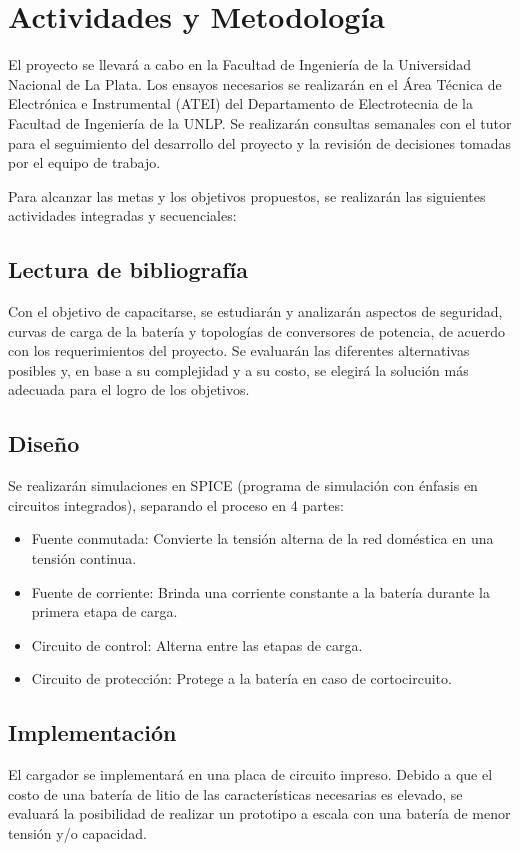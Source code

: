 \section{Actividades y Metodología}


El proyecto se llevará a cabo en la Facultad de Ingeniería de la Universidad Nacional de La Plata.
Los ensayos necesarios se realizarán en el Área Técnica de Electrónica e Instrumental (ATEI)
del Departamento de Electrotecnia de la Facultad de Ingeniería de la UNLP.
Se realizarán consultas semanales con el tutor para el seguimiento del desarrollo del proyecto y
la revisión de decisiones tomadas por el equipo de trabajo.

Para alcanzar las metas y los objetivos propuestos, se realizarán las siguientes actividades integradas y secuenciales:

\subsection{Lectura de bibliografía}
Con el objetivo de capacitarse, se estudiarán y analizarán aspectos de seguridad, curvas de carga de la batería 
y topologías de conversores de potencia, de acuerdo con los requerimientos del proyecto. 
Se evaluarán las diferentes alternativas posibles y,
en base a su complejidad y a su costo,
se elegirá la solución más adecuada para el logro de los objetivos. 

\subsection{Diseño}
Se realizarán simulaciones en SPICE (programa de simulación con énfasis en circuitos integrados),
separando el proceso en 4 partes:
\begin{itemize}
    \item Fuente conmutada: Convierte la tensión alterna de la red doméstica en una tensión continua.
    \item Fuente de corriente: Brinda una corriente constante a la batería durante la primera etapa de carga.
    \item Circuito de control: Alterna entre las etapas de carga.
    \item Circuito de protección: Protege a la batería en caso de cortocircuito.
\end{itemize}

\subsection{Implementación}
El cargador se implementará en una placa de circuito impreso.
Debido a que el costo de una batería de litio de las características necesarias es elevado,
se evaluará la posibilidad de realizar un prototipo a escala con una batería de menor tensión y/o capacidad.

